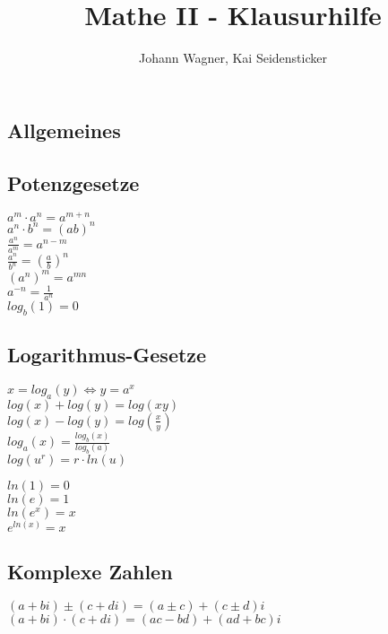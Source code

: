 \documentclass[a4paper,landscape, 11pt]{article}
\author{Johann Wagner, Kai Seidensticker}
\title{Mathe II - Klausurhilfe}
\begin{document}
    \begin{multicols}{4}
        
    
    \begin{small}
    \section{Allgemeines}
        \subsection{Potenzgesetze}
            \begin{multicols}{2}
            $a^m \cdot a^n = a^{m+n}$\\
            $a^n \cdot b^n = (ab)^n$\\
            $\frac{a^n}{a^m} = a^{n-m}$\\
            $\frac{a^n}{b^n} = \left(\frac{a}{b}\right)^n$\\
            $(a^n)^m = a^{mn}$\\
            $a^{-n} = \frac{1}{a^n}$\\
            $log_b(1) = 0$
            \end{multicols}
         \subsection{Logarithmus-Gesetze}
            \noindent
            $x = log_a(y) \Leftrightarrow y = a^x$\\
            $log(x) + log(y) = log(xy)$\\
            $log(x) - log(y) = log(\frac{x}{y})$\\
            $log_a(x) = \frac{log_b(x)}{log_b(a)}$  \\
            $log(u^r) = r \cdot ln(u)$
            \begin{multicols}{2}
            \noindent
            $ln(1) = 0$ \\
            $ln(e) = 1$ \\
            $ln(e^x) = x$ \\
            $e^{ln(x)} = x$
            \end{multicols}
        \subsection{Komplexe Zahlen}
        $(a + bi) \pm (c + di) = (a \pm c) + (c \pm d)i$\\
        $(a + bi) \cdot (c + di) = (ac - bd) + (ad + bc)i$\\
    

\end{small}
\end{multicols}
\end{document}
